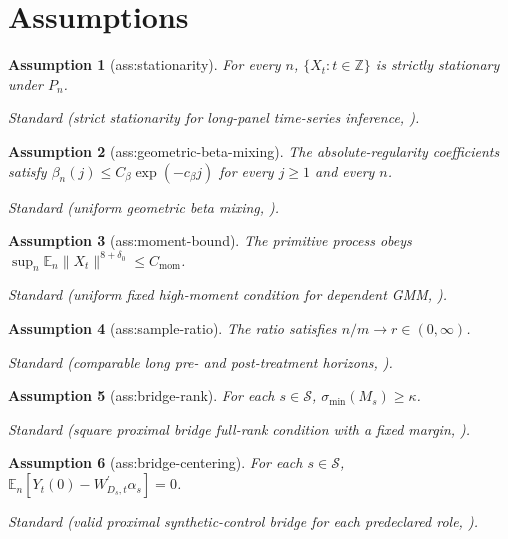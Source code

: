 \documentclass{article}
\newtheorem{assumption}{Assumption}
\begin{document}
\section{Assumptions}

\begin{assumption}[ass:stationarity]\label{ass:stationarity}
For every \(n\), \(\{X_t:t\in\mathbb Z\}\) is strictly stationary under \(P_n\).
\par\smallskip\noindent\emph{Standard} (strict stationarity for long-panel time-series inference, \cite{ShiLiYuMiaoKuchibhotlaHuTchetgen2026}).
\end{assumption}

\begin{assumption}[ass:geometric-beta-mixing]\label{ass:geometric-beta-mixing}
The absolute-regularity coefficients satisfy \(\beta_n(j)\leq C_{\beta}\exp(-c_{\beta}j)\) for every \(j\geq1\) and every \(n\).
\par\smallskip\noindent\emph{Standard} (uniform geometric beta mixing, \cite{Lunde2019SampleSplitting}).
\end{assumption}

\begin{assumption}[ass:moment-bound]\label{ass:moment-bound}
The primitive process obeys \(\sup_n\mathbb E_n\lVert X_t\rVert^{8+\delta_0}\leq C_{\mathrm{mom}}\).
\par\smallskip\noindent\emph{Standard} (uniform fixed high-moment condition for dependent GMM, \cite{QiuShiMiaoDobribanTchetgen2024}).
\end{assumption}

\begin{assumption}[ass:sample-ratio]\label{ass:sample-ratio}
The ratio satisfies \(n/m\to r\in(0,\infty)\).
\par\smallskip\noindent\emph{Standard} (comparable long pre- and post-treatment horizons, \cite{ShiLiYuMiaoKuchibhotlaHuTchetgen2026}).
\end{assumption}

\begin{assumption}[ass:bridge-rank]\label{ass:bridge-rank}
For each \(s\in\mathcal S\), \(\sigma_{\min}(M_s)\geq\kappa\).
\par\smallskip\noindent\emph{Standard} (square proximal bridge full-rank condition with a fixed margin, \cite{ShiLiYuMiaoKuchibhotlaHuTchetgen2026}).
\end{assumption}

\begin{assumption}[ass:bridge-centering]\label{ass:bridge-centering}
For each \(s\in\mathcal S\), \(\mathbb E_n[Y_t(0)-W_{D_s,t}^{\prime}\alpha_s]=0\).
\par\smallskip\noindent\emph{Standard} (valid proximal synthetic-control bridge for each predeclared role, \cite{ShiLiYuMiaoKuchibhotlaHuTchetgen2026}).
\end{assumption}
\end{document}
